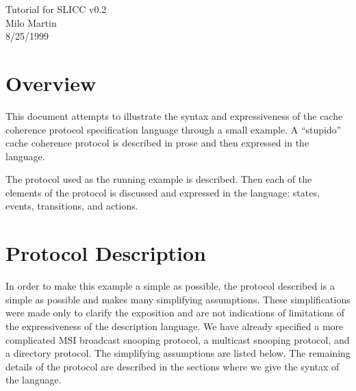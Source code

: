 \documentclass[11pt]{article}
\begin{document}

\newcommand{\syntax}[1]{%
\begin{center}
\fbox{\tt \small
\begin{tabular}{l}
#1\end{tabular}}\end{center}}

\begin{center}
{\LARGE Tutorial for SLICC v0.2} \\
\vspace{.25in}
{\large Milo Martin} \\
{\large 8/25/1999}
\end{center}

\section*{Overview}

This document attempts to illustrate the syntax and expressiveness of
the cache coherence protocol specification language through a small
example.  A ``stupido'' cache coherence protocol is described in prose
and then expressed in the language.

The protocol used as the running example is described.  Then each of
the elements of the protocol is discussed and expressed in the
language: states, events, transitions, and actions.

\section*{Protocol Description}

In order to make this example a simple as possible, the protocol
described is a simple as possible and makes many simplifying
assumptions.  These simplifications were made only to clarify the
exposition and are not indications of limitations of the
expressiveness of the description language.  We have already specified
a more complicated MSI broadcast snooping protocol, a multicast
snooping protocol, and a directory protocol.  The simplifying
assumptions are listed below.  The remaining details of the protocol
are described in the sections where we give the syntax of the
language.
\end{document}
